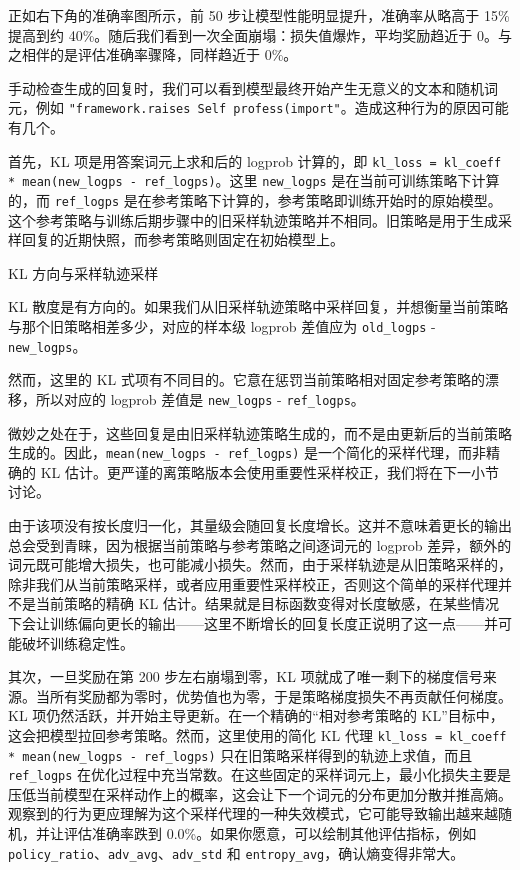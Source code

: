 正如右下角的准确率图所示，前 50 步让模型性能明显提升，准确率从略高于 15\% 提高到约 40\%。随后我们看到一次全面崩塌：损失值爆炸，平均奖励趋近于 0。与之相伴的是评估准确率骤降，同样趋近于 0\%。

手动检查生成的回复时，我们可以看到模型最终开始产生无意义的文本和随机词元，例如 \texttt{"}\texttt{framework.raises Self profess(import}\texttt{"}。造成这种行为的原因可能有几个。

首先，KL 项是用答案词元上求和后的 logprob 计算的，即 \texttt{kl\_loss = kl\_coeff * mean(new\_logps - ref\_logps)}。这里 \texttt{new\_logps} 是在当前可训练策略下计算的，而 \texttt{ref\_logps} 是在参考策略下计算的，参考策略即训练开始时的原始模型。这个参考策略与训练后期步骤中的旧采样轨迹策略并不相同。旧策略是用于生成采样回复的近期快照，而参考策略则固定在初始模型上。

\begin{mySidebar}{KL 方向与采样轨迹采样}

KL 散度是有方向的。如果我们从旧采样轨迹策略中采样回复，并想衡量当前策略与那个旧策略相差多少，对应的样本级 logprob 差值应为 \texttt{old\_logps} - \texttt{new\_logps}。

然而，这里的 KL 式项有不同目的。它意在惩罚当前策略相对固定参考策略的漂移，所以对应的 logprob 差值是 \texttt{new\_logps} - \texttt{ref\_logps}。

微妙之处在于，这些回复是由旧采样轨迹策略生成的，而不是由更新后的当前策略生成的。因此，\texttt{mean(new\_logps - ref\_logps)} 是一个简化的采样代理，而非精确的 KL 估计。更严谨的离策略版本会使用重要性采样校正，我们将在下一小节讨论。

\end{mySidebar}

由于该项没有按长度归一化，其量级会随回复长度增长。这并不意味着更长的输出总会受到青睐，因为根据当前策略与参考策略之间逐词元的 logprob 差异，额外的词元既可能增大损失，也可能减小损失。然而，由于采样轨迹是从旧策略采样的，除非我们从当前策略采样，或者应用重要性采样校正，否则这个简单的采样代理并不是当前策略的精确 KL 估计。结果就是目标函数变得对长度敏感，在某些情况下会让训练偏向更长的输出——这里不断增长的回复长度正说明了这一点——并可能破坏训练稳定性。

其次，一旦奖励在第 200 步左右崩塌到零，KL 项就成了唯一剩下的梯度信号来源。当所有奖励都为零时，优势值也为零，于是策略梯度损失不再贡献任何梯度。KL 项仍然活跃，并开始主导更新。在一个精确的“相对参考策略的 KL”目标中，这会把模型拉回参考策略。然而，这里使用的简化 KL 代理 \texttt{kl\_loss = kl\_coeff * mean(new\_logps - ref\_logps)} 只在旧策略采样得到的轨迹上求值，而且 \texttt{ref\_logps} 在优化过程中充当常数。在这些固定的采样词元上，最小化损失主要是压低当前模型在采样动作上的概率，这会让下一个词元的分布更加分散并推高熵。观察到的行为更应理解为这个采样代理的一种失效模式，它可能导致输出越来越随机，并让评估准确率跌到 0.0\%。如果你愿意，可以绘制其他评估指标，例如 \texttt{policy\_ratio}、\texttt{adv\_avg}、\texttt{adv\_std} 和 \texttt{entropy\_avg}，确认熵变得非常大。

